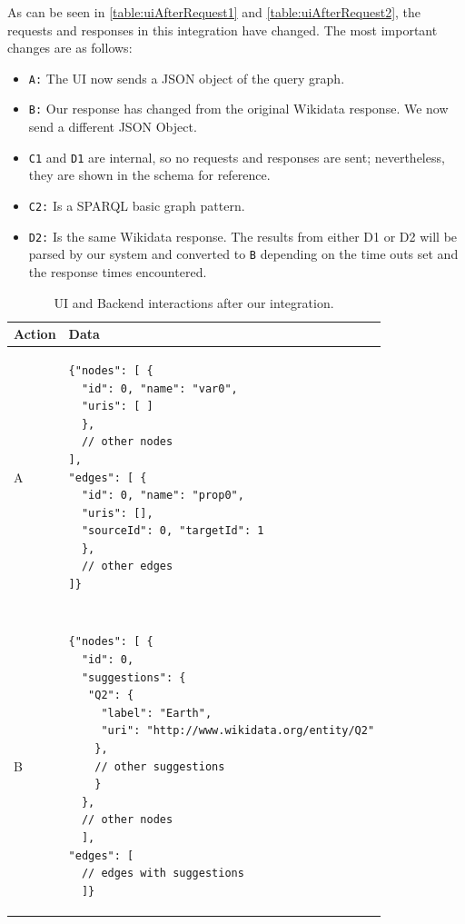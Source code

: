 As can be seen in \autoref{table:uiAfterRequest1} and \autoref{table:uiAfterRequest2}, the requests and responses in this integration have changed. The most important changes are as follows:
\begin{itemize}
    \item \texttt{A:} The UI now sends a JSON object of the query graph.
    \item \texttt{B:} Our response has changed from the original Wikidata response. We now send a different JSON Object.
    \item \texttt{C1} and \texttt{D1} are internal, so no requests and responses are sent; nevertheless, they are shown in the schema for reference.
    \item \texttt{C2:} Is a SPARQL basic graph pattern.
    \item \texttt{D2:} Is the same Wikidata response. The results from either D1 or D2 will be parsed by our system and converted to \texttt{B} depending on the time outs set and the response times encountered.
\end{itemize}
 
\begin{table}[h]
\centering
\begin{tabular}{ll}
Action & Data \\ 
\hline
A              
& \begin{minipage}[t]{0.85\linewidth}
\begin{verbatim}
{"nodes": [ {
  "id": 0, "name": "var0",
  "uris": [ ]
  },
  // other nodes
],
"edges": [ {
  "id": 0, "name": "prop0",
  "uris": [],
  "sourceId": 0, "targetId": 1
  },
  // other edges
]}
\end{verbatim}
\end{minipage}
\\ \\ \\
B             
& \begin{minipage}[t]{0.85\linewidth}
\begin{verbatim}
{"nodes": [ {
  "id": 0, 
  "suggestions": {
   "Q2": {
     "label": "Earth",
     "uri": "http://www.wikidata.org/entity/Q2"
    }, 
    // other suggestions
    } 
  },
  // other nodes
  ], 
"edges": [ 
  // edges with suggestions
  ]}
\end{verbatim}
\end{minipage}
\\
\end{tabular}
\caption{UI and Backend interactions after our integration.}
\label{table:uiAfterRequest1}
\end{table}


